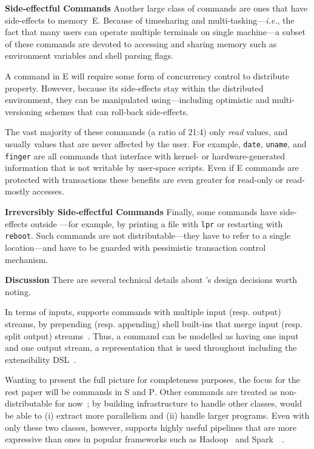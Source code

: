 \documentclass[sigplan,10pt,review,anonymous]{acmart}
\newcommand{\ie}{{\em i.e.}, }
\newcommand{\heading}[1]{\vspace{4pt}\noindent\textbf{#1}\enspace}
\newcommand{\ttt}[1]{\texttt{\small #1}}
\newcommand{\cn}[1]{\mbox{\textcircled{\footnotesize #1}}}
\newcommand{\pur}{\cn{\textsc{P}}\xspace}
\newcommand{\sta}{\cn{\textsc{S}}\xspace}
\newcommand{\sid}{\cn{\textsc{E}}\xspace}
\begin{document}

\heading{Side-effectful Commands}
Another large class of commands are ones that have side-effects to memory~\sid.
Because of timesharing and multi-tasking---\ie the fact that many users can operate multiple terminals on single \unix machine---a subset of these commands are devoted to accessing and sharing memory such as environment variables and shell parsing flags.

A command in \sid will require some form of concurrency control to distribute property.
However, because its side-effects stay within the distributed \unix environment, they can be manipulated using---including optimistic and multi-versioning schemes that can roll-back side-effects.

The vast majority of these commands (a ratio of 21:4) only \emph{read} values, and usually values that are never affected by the user.
For example, \ttt{date}, \ttt{uname}, and \ttt{finger} are all commands that interface with kernel- or hardware-generated information that is not writable by user-space scripts.
Even if \sid commands are protected with transactions
  these benefits are even greater for read-only or read-mostly accesses.

\heading{Irreversibly Side-effectful Commands}
Finally, some commands have side-effects outside \sys---for example, by printing a file with \ttt{lpr} or restarting with \ttt{reboot}.
Such commands are not distributable---they have to refer to a single location---and have to be guarded with pessimistic transaction control mechanism.

\heading{Discussion}
There are several technical details about \sys's design decisions worth noting.

In terms of inputs, \sys supports commands with multiple input (resp. output) streams, by prepending (resp. appending) shell built-ins that merge input (resp. split output) streams~.
Thus, a command can be modelled as having one input and one output stream, a representation that is used throughout \sys including the extensibility DSL~.

Wanting to present the full picture for completeness purposes, the focus for the rest paper will be commands in \sta and \pur.
Other commands are treated as  non-distributable for now~;
  by building infrastructure to handle other classes, \sys would be able to (i) extract more parallelism and (ii) handle larger programs.
Even with only these two classes, however, \sys supports highly useful pipelines that are more expressive than ones in popular frameworks such as Hadoop~\cite{mapreduce:08} and Spark~\cite{spark:12}~.
\end{document}
